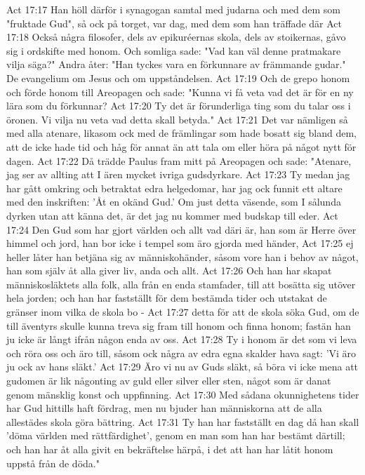 Act 17:17  Han höll därför i synagogan samtal med judarna och med dem som "fruktade Gud", så ock på torget, var dag, med dem som han träffade där
Act 17:18  Också några filosofer, dels av epikuréernas skola, dels av stoikernas, gåvo sig i ordskifte med honom. Och somliga sade: "Vad kan väl denne pratmakare vilja säga?" Andra åter: "Han tyckes vara en förkunnare av främmande gudar." De evangelium om Jesus och om uppståndelsen.
Act 17:19  Och de grepo honom och förde honom till Areopagen och sade: "Kunna vi få veta vad det är för en ny lära som du förkunnar?
Act 17:20  Ty det är förunderliga ting som du talar oss i öronen. Vi vilja nu veta vad detta skall betyda."
Act 17:21  Det var nämligen så med alla atenare, likasom ock med de främlingar som hade bosatt sig bland dem, att de icke hade tid och håg för annat än att tala om eller höra på något nytt för dagen.
Act 17:22  Då trädde Paulus fram mitt på Areopagen och sade: "Atenare, jag ser av allting att I ären mycket ivriga gudsdyrkare.
Act 17:23  Ty medan jag har gått omkring och betraktat edra helgedomar, har jag ock funnit ett altare med den inskriften: 'Åt en okänd Gud.' Om just detta väsende, som I sålunda dyrken utan att känna det, är det jag nu kommer med budskap till eder.
Act 17:24  Den Gud som har gjort världen och allt vad däri är, han som är Herre över himmel och jord, han bor icke i tempel som äro gjorda med händer,
Act 17:25  ej heller låter han betjäna sig av människohänder, såsom vore han i behov av något, han som själv åt alla giver liv, anda och allt.
Act 17:26  Och han har skapat människosläktets alla folk, alla från en enda stamfader, till att bosätta sig utöver hela jorden; och han har fastställt för dem bestämda tider och utstakat de gränser inom vilka de skola bo -
Act 17:27  detta för att de skola söka Gud, om de till äventyrs skulle kunna treva sig fram till honom och finna honom; fastän han ju icke är långt ifrån någon enda av oss.
Act 17:28  Ty i honom är det som vi leva och röra oss och äro till, såsom ock några av edra egna skalder hava sagt: 'Vi äro ju ock av hans släkt.'
Act 17:29  Äro vi nu av Guds släkt, så böra vi icke mena att gudomen är lik någonting av guld eller silver eller sten, något som är danat genom mänsklig konst och uppfinning.
Act 17:30  Med sådana okunnighetens tider har Gud hittills haft fördrag, men nu bjuder han människorna att de alla allestädes skola göra bättring.
Act 17:31  Ty han har fastställt en dag då han skall 'döma världen med rättfärdighet', genom en man som han har bestämt därtill; och han har åt alla givit en bekräftelse härpå, i det att han har låtit honom uppstå från de döda."
